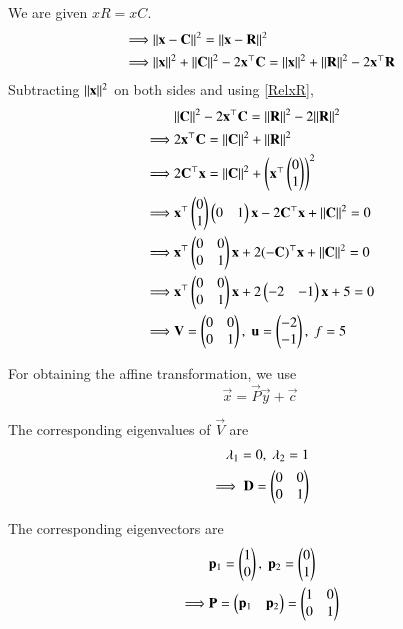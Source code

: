 \documentclass[journal,12pt,twocolumn]{IEEEtran}
\begin{document}
We are given $xR = xC$.  
\begin{align}
    \implies &\lVert\mathbf{x} - \mathbf{C}\rVert^2 = \lVert\mathbf{x} - \mathbf{R}\rVert^2\\ 
    \implies &\lVert\mathbf{x}\rVert^2+\lVert\mathbf{C}\rVert^2-2\mathbf{x}^\top \mathbf{C} = \lVert\mathbf{x}\rVert^2+\lVert\mathbf{R}\rVert^2-2\mathbf{x}^\top \mathbf{R}
\end{align}
Subtracting $\lVert\mathbf{x}\rVert^2$ on both sides and using \ref{RelxR},
\begin{align}
    &\lVert\mathbf{C}\rVert^2-2\mathbf{x}^\top \mathbf{C} = \lVert\mathbf{R}\rVert^2 - 2\lVert\mathbf{R}\rVert^2\\
    \implies &2\mathbf{x}^\top \mathbf{C} = \lVert\mathbf{C}\rVert^2+\lVert\mathbf{R}\rVert^2\\
    \implies &2\mathbf{C}^\top \mathbf{x} = \lVert\mathbf{C}\rVert^2+\begin{pmatrix}\mathbf{x}^\top \begin{pmatrix}0\\1\end{pmatrix}\end{pmatrix}^2\\
    \implies &\mathbf{x}^\top \begin{pmatrix}0\\1\end{pmatrix} \begin{pmatrix}0 & 1\end{pmatrix} \mathbf{x} - 2\mathbf{C}^\top \mathbf{x} + \lVert\mathbf{C}\rVert^2 = 0\\
    \implies &\mathbf{x}^\top \begin{pmatrix}0&0\\0&1\end{pmatrix}\mathbf{x} + 2(-\mathbf{C})^\top\mathbf{x} + \lVert\mathbf{C}\rVert^2 = 0\\
    \implies &\mathbf{x}^\top \begin{pmatrix}0&0\\0&1\end{pmatrix}\mathbf{x} + 2\begin{pmatrix}-2&-1\end{pmatrix}\mathbf{x} + 5 = 0\\
    \implies &\mathbf{V} = \begin{pmatrix}0&0\\0&1\end{pmatrix},\; \mathbf{u} = \begin{pmatrix}-2\\-1\end{pmatrix},\; f = 5
\end{align}

For obtaining the affine transformation, we use 
\begin{equation}
    \vec{x} = \vec{P}\vec{y}+\vec{c}
\end{equation}

The corresponding eigenvalues of $\vec{V}$ are
\begin{align}
    \lambda_1 = 0,\; \lambda_2 = 1\\
    \implies \mathbf{D} = \begin{pmatrix}0&0\\0&1\end{pmatrix}
\end{align}

The corresponding eigenvectors are
\begin{align}
    &\mathbf{p}_1 = \begin{pmatrix}1\\0\end{pmatrix},\; \mathbf{p}_2 = \begin{pmatrix}0\\1\end{pmatrix}\\
    \implies &\mathbf{P} = \begin{pmatrix}\mathbf{p}_1 & \mathbf{p}_2\end{pmatrix} = \begin{pmatrix}1&0\\0&1\end{pmatrix}
\end{align}
\end{document}
